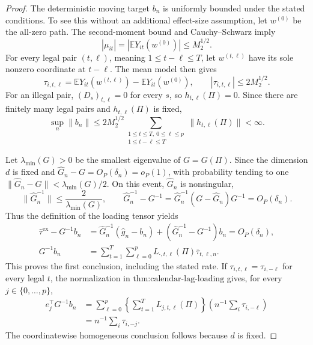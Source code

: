 \documentclass{article}
\begin{document}
\begin{proof}
The deterministic moving target \(b_n\) is uniformly bounded under the stated conditions. To see this without an additional effect-size assumption, let \(w^{(0)}\) be the all-zero path. The second-moment bound and Cauchy--Schwarz imply
\[
|\mu_{it}|=|\mathbb E Y_{it}(w^{(0)})|\leq M_2^{1/2}.
\]
For every legal pair \((t,\ell)\), meaning \(1\leq t-\ell\leq T\), let \(w^{(t,\ell)}\) have its sole nonzero coordinate at \(t-\ell\). The mean model then gives
\[
\tau_{i,t,\ell}
=\mathbb E Y_{it}(w^{(t,\ell)})-\mathbb E Y_{it}(w^{(0)}),
\qquad
|\tau_{i,t,\ell}|\leq 2M_2^{1/2}.
\]
For an illegal pair, \((D_s)_{t,\ell}=0\) for every \(s\), so \(h_{t,\ell}(\Pi)=0\). Since there are finitely many legal pairs and \(h_{t,\ell}(\Pi)\) is fixed,
\[
\sup_n\|b_n\|
\leq 2M_2^{1/2}\sum_{\substack{1\leq t\leq T,\ 0\leq\ell\leq p\\1\leq t-\ell\leq T}}
\|h_{t,\ell}(\Pi)\|<\infty.
\]

Let \(\lambda_{\min}(G)>0\) be the smallest eigenvalue of \(G=G(\Pi)\). Since the dimension \(d\) is fixed and \(\widehat G_n-G=O_P(\delta_n)=o_P(1)\), with probability tending to one
\(\|\widehat G_n-G\|<\lambda_{\min}(G)/2\). On this event, \(\widehat G_n\) is nonsingular,
\[
\|\widehat G_n^{-1}\|\leq \frac{2}{\lambda_{\min}(G)},
\qquad
\widehat G_n^{-1}-G^{-1}
=\widehat G_n^{-1}(G-\widehat G_n)G^{-1}
=O_P(\delta_n).
\]
Thus the definition of the loading tensor yields
\[
\begin{aligned}
\widehat\tau^{\mathrm{ex}}-G^{-1}b_n
&=\widehat G_n^{-1}(\widehat g_n-b_n)
  +(\widehat G_n^{-1}-G^{-1})b_n
=O_P(\delta_n),\\
G^{-1}b_n
&=\sum_{t=1}^{T}\sum_{\ell=0}^{p}
L_{\cdot,t,\ell}(\Pi)\overline\tau_{t,\ell,n}.
\end{aligned}
\]
This proves the first conclusion, including the stated rate. If
\(\tau_{i,t,\ell}=\tau_{i,-\ell}\) for every legal \(t\), the normalization in \(\text{thm:calendar-lag-loading}\) gives, for every \(j\in\{0,\ldots,p\}\),
\[
\begin{aligned}
e_j^{\top}G^{-1}b_n
&=\sum_{\ell=0}^{p}\left\{\sum_{t=1}^{T}L_{j,t,\ell}(\Pi)\right\}
  \left(n^{-1}\sum_i\tau_{i,-\ell}\right)\\
&=n^{-1}\sum_i\tau_{i,-j}.
\end{aligned}
\]
The coordinatewise homogeneous conclusion follows because \(d\) is fixed.


\end{proof}
\end{document}
